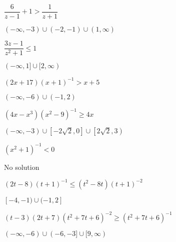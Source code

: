 \documentclass{ximera}
\begin{document}
\begin{question}
$\dfrac{6}{z-1} + 1 > \dfrac{1}{z+1}$
\begin{solution}
$(-\infty, -3) \cup (-2, -1) \cup (1, \infty)$

\end{solution}

\end{question}

\begin{question}
$\dfrac{3z - 1}{z^{2} + 1} \leq 1$

\begin{solution}
$(-\infty, 1] \cup [2, \infty)$
\end{solution}

\end{question}

\begin{question}
$(2x+17)(x+1)^{-1} > x + 5$
\begin{solution}
$(-\infty, -6) \cup (-1, 2)$

\end{solution}

\end{question}

\begin{question}
$(4x-x^3)(x^{2} - 9)^{-1} \geq 4x$
\begin{solution}
$(-\infty, -3) \cup \left[-2\sqrt{2}, 0\right] \cup \left[2\sqrt{2}, 3\right)$
\end{solution}

\end{question}

\begin{question}
$(x^{2} + 1)^{-1} < 0$ 

\begin{solution}
No solution

\end{solution}

\end{question}

\begin{question}
$(2t-8)(t+1)^{-1} \leq (t^2-8t)(t+1)^{-2}$ %
\begin{solution}
$[-4, -1) \cup (-1,2]$
\end{solution}

\end{question}

\begin{question}
$(t-3)(2t+7)(t^2+7t+6)^{-2} \geq (t^2+7t+6)^{-1}$ %

\begin{solution}
$(-\infty, -6) \cup (-6, -3] \cup [9, \infty)$

\end{solution}

\end{question}
\end{document}
